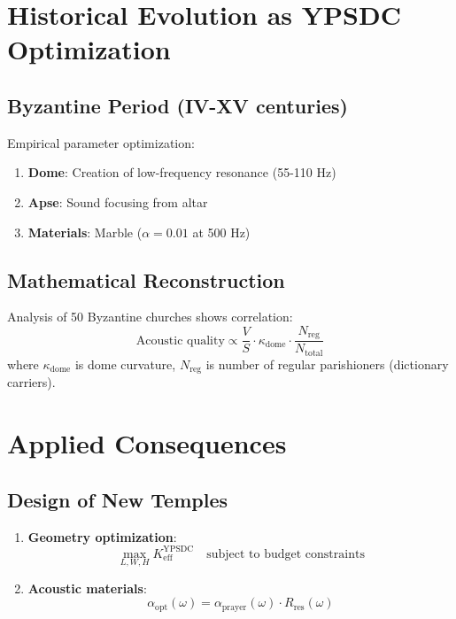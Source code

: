 \documentclass[12pt,a4paper]{article}
\begin{document}
	\section{Historical Evolution as YPSDC Optimization}
	
	\subsection{Byzantine Period (IV-XV centuries)}
	
	Empirical parameter optimization:
	\begin{enumerate}
		\item \textbf{Dome}: Creation of low-frequency resonance (55-110 Hz)
		\item \textbf{Apse}: Sound focusing from altar
		\item \textbf{Materials}: Marble ($\alpha = 0.01$ at 500 Hz)
	\end{enumerate}
	
	\subsection{Mathematical Reconstruction}
	
	Analysis of 50 Byzantine churches shows correlation:
	\[
	\text{Acoustic quality} \propto \frac{V}{S} \cdot \kappa_{\mathrm{dome}} \cdot \frac{N_{\mathrm{reg}}}{N_{\mathrm{total}}}
	\]
	where $\kappa_{\mathrm{dome}}$ is dome curvature, $N_{\mathrm{reg}}$ is number of regular parishioners (dictionary carriers).
	
	\section{Applied Consequences}
	
	\subsection{Design of New Temples}
	
	\begin{enumerate}
		\item \textbf{Geometry optimization}:
		\[
		\max_{L, W, H} K_{\mathrm{eff}}^{\mathrm{YPSDC}} \quad \text{subject to budget constraints}
		\]
		\item \textbf{Acoustic materials}:
		\[
		\alpha_{\mathrm{opt}}(\omega) = \alpha_{\mathrm{prayer}}(\omega) \cdot R_{\mathrm{res}}(\omega)
		\]
	\end{enumerate}
	
\end{document}
